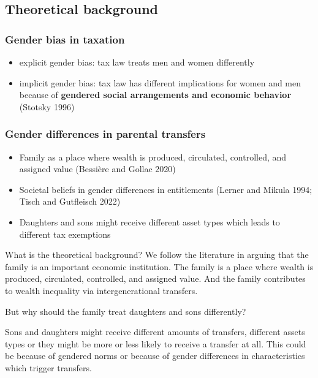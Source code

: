 \documentclass[
  letterpaper,
  DIV=11,
  numbers=noendperiod]{scrartcl}
\providecommand{\tightlist}{%
  \setlength{\itemsep}{0pt}\setlength{\parskip}{0pt}}\usepackage{longtable,booktabs,array}
\begin{document}
\hypertarget{theoretical-background}{%
\subsection{Theoretical background}\label{theoretical-background}}

\hypertarget{gender-bias-in-taxation}{%
\subsubsection{Gender bias in taxation}\label{gender-bias-in-taxation}}

\begin{itemize}
\tightlist
\item
  explicit gender bias: tax law treats men and women differently
\item
  implicit gender bias: tax law has different implications for women and
  men because of \textbf{gendered social arrangements and economic
  behavior} (Stotsky 1996)
\end{itemize}

\hypertarget{gender-differences-in-parental-transfers}{%
\subsubsection{Gender differences in parental
transfers}\label{gender-differences-in-parental-transfers}}

\begin{itemize}
\tightlist
\item
  Family as a place where wealth is produced, circulated, controlled,
  and assigned value (Bessière and Gollac 2020)
\item
  Societal beliefs in gender diﬀerences in entitlements (Lerner and
  Mikula 1994; Tisch and Gutfleisch 2022)
\item
  Daughters and sons might receive diﬀerent asset types which leads to
  different tax exemptions
\end{itemize}

What is the theoretical background? We follow the literature in arguing
that the family is an important economic institution. The family is a
place where wealth is produced, circulated, controlled, and assigned
value. And the family contributes to wealth inequality via
intergenerational transfers.

But why should the family treat daughters and sons differently?

Sons and daughters might receive different amounts of transfers,
different assets types or they might be more or less likely to receive a
transfer at all. This could be because of gendered norms or because of
gender differences in characteristics which trigger transfers.
\end{document}
